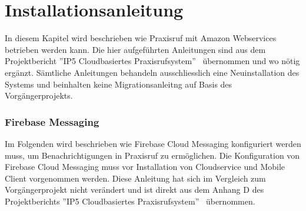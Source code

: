 \section{Installationsanleitung}

In diesem Kapitel wird beschrieben wie Praxisruf mit Amazon Webservices betrieben werden kann.
Die hier aufgeführten Anleitungen sind aus dem Projektbericht ''IP5 Cloudbasiertes Praxisrufsystem''~\cite{ip5} übernommen und wo nötig ergänzt.
Sämtliche Anleitungen behandeln ausschliesslich eine Neuinstallation des Systems und beinhalten keine Migrationsanleitng auf Basis des Vorgängerprojekts.

\subsubsection*{Firebase Messaging}

Im Folgenden wird beschrieben wie Firebase Cloud Messaging konfiguriert werden muss, um Benachrichtigungen in Praxisruf zu ermöglichen.
Die Konfiguration von Firebase Cloud Messaging muss vor Installation von Cloudservice und Mobile Client vorgenommen werden.
Diese Anleitung hat sich im Vergleich zum Vorgängerprojekt nicht verändert und ist direkt aus dem Anhang D des Projektberichts ''IP5 Cloudbasiertes Praxisrufsystem''~\cite{ip5} übernommen.

